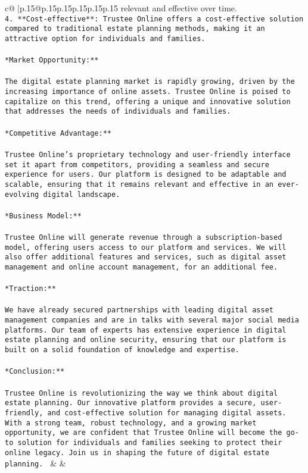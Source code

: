 \documentclass{article}
\begin{document}
{\begin{supertabular}{c@{$\;$}|p{.15\linewidth}@{}p{.15\linewidth}p{.15\linewidth}p{.15\linewidth}p{.15\linewidth}p{.15\linewidth}}
{{{relevant and effective over time.\\ \tt 4. **Cost-effective**: Trustee Online offers a cost-effective solution compared to traditional estate planning methods, making it an attractive option for individuals and families.\\ \tt \\ \tt **Market Opportunity:**\\ \tt \\ \tt The digital estate planning market is rapidly growing, driven by the increasing importance of online assets. Trustee Online is poised to capitalize on this trend, offering a unique and innovative solution that addresses the needs of individuals and families.\\ \tt \\ \tt **Competitive Advantage:**\\ \tt \\ \tt Trustee Online's proprietary technology and user-friendly interface set it apart from competitors, providing a seamless and secure experience for users. Our platform is designed to be adaptable and scalable, ensuring that it remains relevant and effective in an ever-evolving digital landscape.\\ \tt \\ \tt **Business Model:**\\ \tt \\ \tt Trustee Online will generate revenue through a subscription-based model, offering users access to our platform and services. We will also offer additional features and services, such as digital asset management and online account management, for an additional fee.\\ \tt \\ \tt **Traction:**\\ \tt \\ \tt We have already secured partnerships with leading digital asset management companies and are in talks with several major social media platforms. Our team of experts has extensive experience in digital estate planning and online security, ensuring that our platform is built on a solid foundation of knowledge and expertise.\\ \tt \\ \tt **Conclusion:**\\ \tt \\ \tt Trustee Online is revolutionizing the way we think about digital estate planning. Our innovative platform provides a secure, user-friendly, and cost-effective solution for managing digital assets. With a strong team, robust technology, and a growing market opportunity, we are confident that Trustee Online will become the go-to solution for individuals and families seeking to protect their online legacy. Join us in shaping the future of digital estate planning. 
	  } 
	   } 
	   } 
	 & & \\ 
 


\end{supertabular}}
\end{document}
